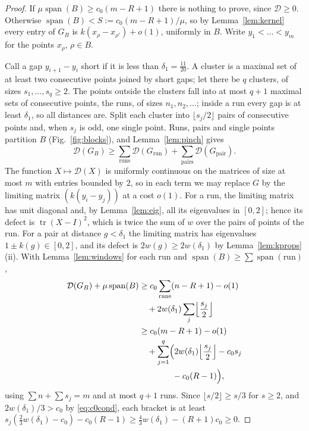 \documentclass[aps,prd,twocolumn,superscriptaddress,nofootinbib,longbibliography,floatfix,showkeys,amsmath,amssymb,10pt]{revtex4-2}
\theoremstyle{definition}
\theoremstyle{remark}
\newcommand{\cD}{\mathcal{D}}
\DeclareMathOperator{\tr}{tr}
\DeclareMathOperator{\spanop}{span}
\begin{document}
\begin{proof}
If $\mu\spanop(B)\ge c_0(m-R+1)$ there is nothing to prove, since
$\cD\ge0$. Otherwise $\spanop(B)<S:=c_0(m-R+1)/\mu$, so by
Lemma~\ref{lem:kernel} every entry of $G_B$ is
$k(x_\rho-x_{\rho'})+o(1)$, uniformly in $B$. Write
$y_1<\dots<y_m$ for the points $x_\rho$, $\rho\in B$.

Call a gap $y_{i+1}-y_i$ short if it is less than $\delta_1=\frac{11}{20}$.
A cluster is a maximal set of at least two consecutive points joined by
short gaps; let there be $q$ clusters, of sizes $s_1,\dots,s_q\ge2$. The
points outside the clusters fall into at most $q+1$ maximal sets of
consecutive points, the runs, of sizes $n_1,n_2,\dots$; inside a run every
gap is at least $\delta_1$, so all distances are. Split each cluster into
$\lfloor s_j/2\rfloor$ pairs of consecutive points and, when $s_j$ is odd,
one single point. Runs, pairs and single points partition $B$
(Fig.~\ref{fig:blocks}), and Lemma~\ref{lem:pinch} gives
\[
 \cD(G_B)\ge\sum_{\text{runs}}\cD(G_{\text{run}})
 +\sum_{\text{pairs}}\cD(G_{\text{pair}}).
\]
The function $X\mapsto\cD(X)$ is uniformly continuous on the matrices of
size at most $m$ with entries bounded by $2$, so in each term we may replace
$G$ by the limiting matrix $(k(y_i-y_j))$ at a cost $o(1)$. For a run, the
limiting matrix has unit diagonal and, by Lemma~\ref{lem:eig}, all its
eigenvalues in $[0,2]$; hence its defect is $\tr(X-I)^2$, which is twice
the sum of $w$ over the pairs of points of the run. For a pair at distance
$g<\delta_1$ the limiting matrix has eigenvalues $1\pm k(g)\in[0,2]$, and its
defect is $2w(g)\ge2w(\delta_1)$ by Lemma~\ref{lem:kprops}(ii). With
Lemma~\ref{lem:windows} for each run and $\spanop(B)\ge\sum\spanop(\text{run})$,
\begin{align*}
 \cD(G_B)+\mu\spanop(B)
 &\ge c_0\sum_{\text{runs}}(n-R+1)-o(1)\\
 &\quad+2w(\delta_1)\sum_j\Bigl\lfloor\frac{s_j}2\Bigr\rfloor\\
 &\ge c_0(m-R+1)-o(1)\\
 &\quad+\sum_{j=1}^q\Bigl(2w(\delta_1)\Bigl\lfloor\frac{s_j}2\Bigr\rfloor
   -c_0s_j\\
 &\qquad\qquad-c_0(R-1)\Bigr),
\end{align*}
using $\sum n+\sum s_j=m$ and at most $q+1$ runs. Since
$\lfloor s/2\rfloor\ge s/3$ for $s\ge2$, and $2w(\delta_1)/3>c_0$ by
\eqref{eq:c0cond}, each bracket is at least
$s_j(\frac23w(\delta_1)-c_0)-c_0(R-1)\ge\frac43w(\delta_1)-(R+1)c_0\ge0$.
\end{proof}
\end{document}
